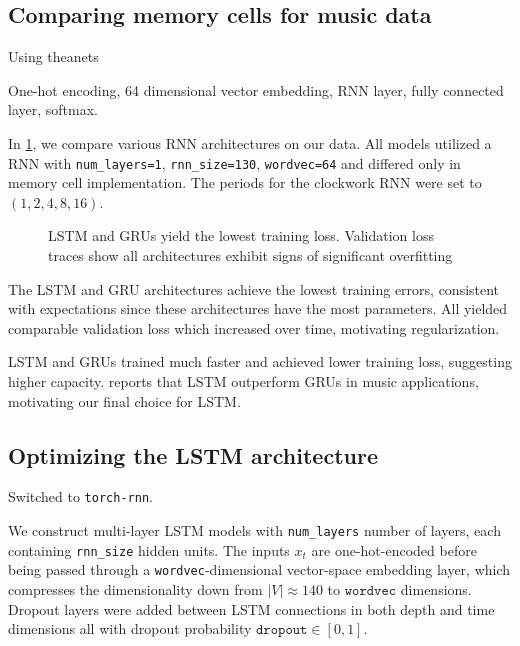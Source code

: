 \subsection{Comparing memory cells for music data}

Using theanets

One-hot encoding, 64 dimensional vector embedding, RNN layer, fully connected layer, softmax.

In \cref{fig:theanets-architecture}, we compare various RNN architectures on
our data. All models utilized a RNN with \texttt{num\_layers=1},
\texttt{rnn\_size=130}, \texttt{wordvec=64} and differed only in memory cell
implementation. The periods for the clockwork RNN \citep{cho2014learning} were
set to $(1, 2, 4, 8, 16)$.

\begin{figure}[tb]
    \centering
    
    \caption{LSTM and GRUs yield the lowest training loss. Validation loss
      traces show all architectures exhibit signs of significant overfitting}
    \label{fig:theanets-architecture}
\end{figure}

The LSTM and GRU architectures achieve the lowest training errors, consistent
with expectations since these architectures have the most parameters. All
yielded comparable validation loss which increased over time, motivating
regularization.

LSTM and GRUs trained much faster and achieved lower training loss, suggesting
higher capacity. \citep{Nayebi2015} reports that LSTM outperform GRUs in music
applications, motivating our final choice for LSTM.

\subsection{Optimizing the LSTM architecture}
\label{sec:lstm-grid-search}

Switched to \texttt{torch-rnn}. 

We construct multi-layer LSTM models with \texttt{num\_layers} number of
layers, each containing \texttt{rnn\_size} hidden units. The inputs $x_t$ are
one-hot-encoded before being passed through a \texttt{wordvec}-dimensional
vector-space embedding layer, which compresses the dimensionality down from
$|V| \approx 140$ to $\texttt{wordvec}$ dimensions. Dropout layers were added
between LSTM connections in both depth and time dimensions all with dropout
probability $\texttt{dropout} \in [0,1]$.

